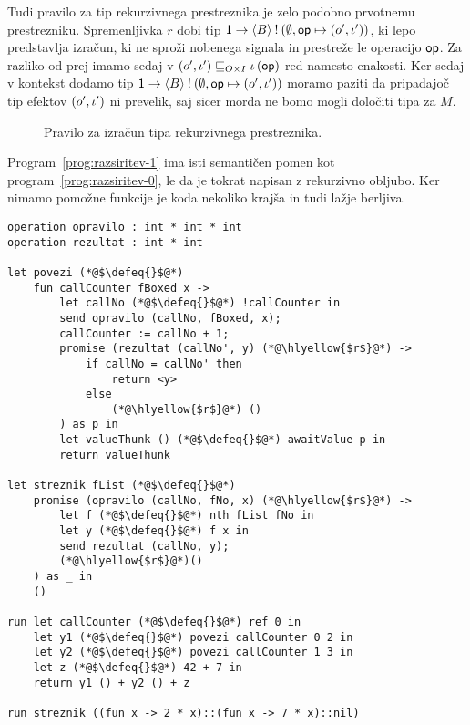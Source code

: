 Tudi pravilo za tip rekurzivnega prestreznika je zelo podobno prvotnemu prestrezniku. Spremenljivka $r$ dobi tip $\tyfun{\tyunit}{\tycomp{\typromise{B}}{\emptyset, \op \mapsto (\o', \i')}}$, ki lepo predstavlja izračun, ki ne sproži nobenega signala in prestreže le operacijo $\op$.
Za razliko od prej imamo sedaj v $({\o'} , {\i'}) \order{O \times I} \i\, (\op)$ red namesto enakosti. Ker sedaj v kontekst dodamo tip $\tyfun{\tyunit}{\tycomp{\typromise{B}}{\emptyset, \op \mapsto (\o', \i')}}$ moramo paziti da pripadajoč tip efektov $(\o', \i')$ ni prevelik, saj sicer morda ne bomo mogli določiti tipa za $M$.

\begin{figure}[H]
	\centering
	\small
	\begin{mathpar}
	\end{mathpar}
	
	\caption{Pravilo za izračun tipa rekurzivnega prestreznika.}
	\label{fig:tipi-pravila-rekurzivni-prestreznik}
\end{figure} 

Program~\ref{prog:razsiritev-1} ima isti semantičen pomen kot program~\ref{prog:razsiritev-0}, le da je tokrat napisan z rekurzivno obljubo. Ker nimamo pomožne funkcije je koda nekoliko krajša in tudi lažje berljiva.

\begin{lstlisting}[caption={Primer z rekurzivnim prestreznikom},label={prog:razsiritev-1},float,floatplacement=h]
operation opravilo : int * int * int
operation rezultat : int * int

let povezi (*@$\defeq{}$@*)
	fun callCounter fBoxed x ->
		let callNo (*@$\defeq{}$@*) !callCounter in
		send opravilo (callNo, fBoxed, x);
		callCounter := callNo + 1;
		promise (rezultat (callNo', y) (*@\hlyellow{$r$}@*) ->
			if callNo = callNo' then
				return <y>
			else
				(*@\hlyellow{$r$}@*) ()
		) as p in
		let valueThunk () (*@$\defeq{}$@*) awaitValue p in
		return valueThunk

let streznik fList (*@$\defeq{}$@*)
	promise (opravilo (callNo, fNo, x) (*@\hlyellow{$r$}@*) ->
		let f (*@$\defeq{}$@*) nth fList fNo in
		let y (*@$\defeq{}$@*) f x in
		send rezultat (callNo, y);
		(*@\hlyellow{$r$}@*)()
	) as _ in
	()

run	let callCounter (*@$\defeq{}$@*) ref 0 in
	let y1 (*@$\defeq{}$@*) povezi callCounter 0 2 in
	let y2 (*@$\defeq{}$@*) povezi callCounter 1 3 in
	let z (*@$\defeq{}$@*) 42 + 7 in
	return y1 () + y2 () + z

run streznik ((fun x -> 2 * x)::(fun x -> 7 * x)::nil)
\end{lstlisting}


